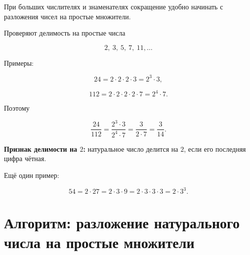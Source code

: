 \documentclass[a4paper,12pt]{article}
\begin{document}
При больших числителях и знаменателях
сокращение удобно начинать с разложения чисел
на простые множители.

Проверяют делимость на простые числа

\[
2,\ 3,\ 5,\ 7,\ 11,\ldots
\]

Примеры:

\[
24
=
2\cdot2\cdot2\cdot3
=
2^3\cdot3,
\]

\[
112
=
2\cdot2\cdot2\cdot2\cdot7
=
2^4\cdot7.
\]

Поэтому

\[
\frac{24}{112}
=
\frac{2^3\cdot3}{2^4\cdot7}
=
\frac{3}{2\cdot7}
=
\frac3{14}.
\]

\textbf{Признак делимости на \(2\):}
натуральное число делится на \(2\),
если его последняя цифра чётная.

Ещё один пример:

\[
54
=
2\cdot27
=
2\cdot3\cdot9
=
2\cdot3\cdot3\cdot3
=
2\cdot3^3.
\]

\clearpage
\thispagestyle{empty}

\section*{Алгоритм: разложение натурального числа на простые множители}

\vspace{0.8cm}
\end{document}
